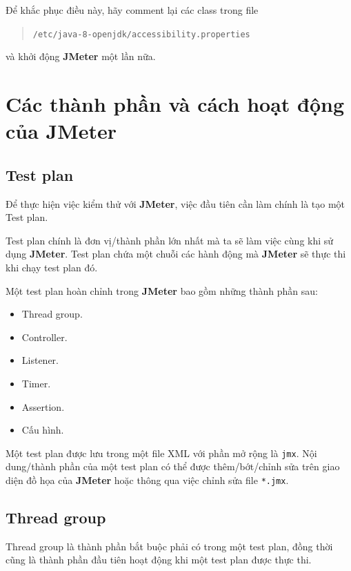 \documentclass[10pt]{report}
\newcommand{\jmeter}{\textbf{JMeter}}
\begin{document}
\par Để khắc phục điều này, hãy comment lại các class trong file
\begin{quotation}
\texttt{/etc/java-8-openjdk/accessibility.properties}
\end{quotation}
\par và khởi động \jmeter{} một lần nữa.

\chapter{Các thành phần và cách hoạt động của JMeter}

\section{Test plan}

\par Để thực hiện việc kiểm thử với \jmeter{}, việc đầu tiên cần làm chính là tạo một Test plan.

\par Test plan chính là đơn vị/thành phần lớn nhất mà ta sẽ làm việc cùng khi sử dụng \jmeter{}. Test plan chứa một chuỗi các hành động mà \jmeter{} sẽ thực thi khi chạy test plan đó.

\par Một test plan hoàn chỉnh trong \jmeter{} bao gồm những thành phần sau:
\begin{itemize}[itemsep=0pt]
    \item Thread group.
    \item Controller.
    \item Listener.
    \item Timer.
    \item Assertion.
    \item Cấu hình.
\end{itemize}

\par Một test plan được lưu trong một file XML với phần mở rộng là \texttt{jmx}. Nội dung/thành phần của một test plan có thể được thêm/bớt/chỉnh sửa trên giao diện đồ họa của \jmeter{} hoặc thông qua việc chỉnh sửa file \texttt{*.jmx}.

\section{Thread group}

\par Thread group là thành phần bắt buộc phải có trong một test plan, đồng thời cũng là thành phần đầu tiên hoạt động khi một test plan được thực thi.
\end{document}
